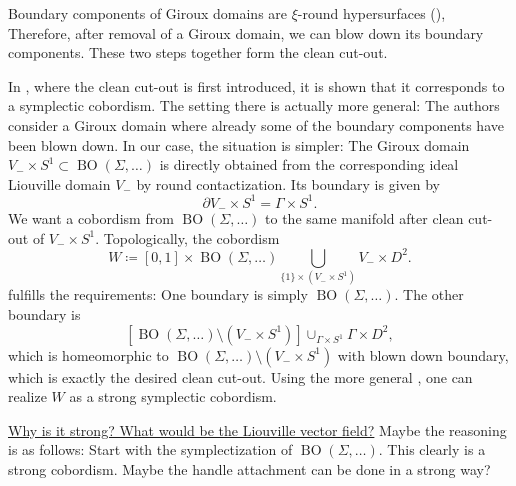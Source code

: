 \begin{figure}
\begin{subfigure}{.9\linewidth}
    \end{subfigure}
\end{figure}

Boundary components of Giroux domains are 
$\xi$-round hypersurfaces (\cite[Section 5.3]{MNW13}),
Therefore, after removal of a Giroux domain, we can blow down
its boundary components.
These two steps together form the clean cut-out.

In \cite[Section 6]{MNW13}, where the clean cut-out is first introduced,
it is shown that it corresponds to a symplectic cobordism.
The setting there is actually more general: The authors consider a Giroux
domain where already some of the boundary components have been blown down.
In our case, the situation is simpler: The Giroux domain 
$V_- \times S^1 \subset \operatorname{BO}(\Sigma, \dots)$
is directly obtained from the corresponding ideal Liouville domain $V_-$ by 
round contactization.
Its boundary is given by 
\[
    \partial V_- \times S^1 = \Gamma \times S^1.
\]
We want a cobordism from $\operatorname{BO}(\Sigma, \dots)$ to
the same manifold after clean cut-out of $V_- \times S^1$.
Topologically, the cobordism
\[
    W \coloneqq [0,1] \times \operatorname{BO}(\Sigma, \dots) \bigcup_{\{1\} \times \left(V_- \times S^1\right)} V_- \times D^2.
\]
fulfills the requirements: One boundary is simply 
$\operatorname{BO}(\Sigma, \dots)$.
The other boundary is 
\[
    \left[\operatorname{BO}(\Sigma, \dots) \setminus \left(V_- \times S^1\right)\right] 
    \cup_{\Gamma \times S^1} \Gamma \times D^2,
\]
which is homeomorphic to 
$\operatorname{BO}(\Sigma, \dots) \setminus \left(V_- \times S^1\right)$
with blown down boundary, which is exactly the desired clean cut-out.
Using the more general \cite[Theorem 6.1]{MNW13}, one can realize 
$W$ as a strong symplectic cobordism.

\underline{Why is it strong? What would be the Liouville vector field?}
Maybe the reasoning is as follows: Start with the symplectization
of $\operatorname{BO}(\Sigma, \dots)$. This clearly is a strong cobordism.
Maybe the handle attachment can be done in a strong way?


